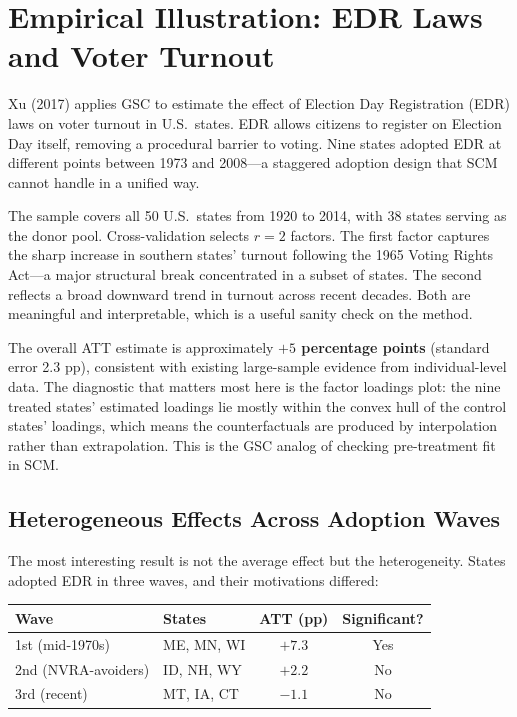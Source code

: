 \documentclass[12pt]{article}
\begin{document}
\section{Empirical Illustration: EDR Laws and Voter Turnout}

Xu (2017) applies GSC to estimate the effect of Election Day Registration (EDR) laws
on voter turnout in U.S.\ states.
EDR allows citizens to register on Election Day itself, removing a procedural barrier
to voting.
Nine states adopted EDR at different points between 1973 and 2008---a staggered
adoption design that SCM cannot handle in a unified way.

The sample covers all 50 U.S.\ states from 1920 to 2014,
with 38 states serving as the donor pool.
Cross-validation selects $r = 2$ factors.
The first factor captures the sharp increase in southern states' turnout following
the 1965 Voting Rights Act---a major structural break concentrated in a subset of states.
The second reflects a broad downward trend in turnout across recent decades.
Both are meaningful and interpretable, which is a useful sanity check on the method.

The overall ATT estimate is approximately \textbf{$+5$ percentage points}
(standard error 2.3 pp), consistent with existing large-sample evidence from
individual-level data.
The diagnostic that matters most here is the factor loadings plot:
the nine treated states' estimated loadings lie mostly within the convex hull of
the control states' loadings, which means the counterfactuals are produced by
interpolation rather than extrapolation.
This is the GSC analog of checking pre-treatment fit in SCM.

\subsection{Heterogeneous Effects Across Adoption Waves}

The most interesting result is not the average effect but the heterogeneity.
States adopted EDR in three waves, and their motivations differed:

\begin{center}
\begin{tabular}{llcc}
  \toprule
  Wave & States & ATT (pp) & Significant? \\
  \midrule
  1st (mid-1970s) & ME, MN, WI & $+7.3$ & Yes \\
  2nd (NVRA-avoiders) & ID, NH, WY & $+2.2$ & No \\
  3rd (recent) & MT, IA, CT & $-1.1$ & No \\
  \bottomrule
\end{tabular}
\end{center}
\end{document}
